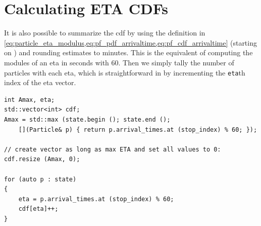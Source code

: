 \section{Calculating ETA CDFs}
\label{app:particle-eta-cdf}

It is also possible to summarize the \gls{cdf} by using the definition in \cref{eq:particle_eta_modulus,eq:pf_pdf_arrivaltime,eq:pf_cdf_arrivaltime} (starting on ) and rounding estimates to minutes. This is the equivalent of computing the modules of an \gls{eta} in seconds with 60. Then we simply tally the number of particles with each \gls{eta}, which is straightforward in \Cpp{} by incrementing the \verb+eta+th index of the \gls{eta} vector.


\begin{lstlisting}
int Amax, eta;
std::vector<int> cdf;
Amax = std::max (state.begin (); state.end ();
    [](Particle& p) { return p.arrival_times.at (stop_index) % 60; });

// create vector as long as max ETA and set all values to 0:
cdf.resize (Amax, 0);

for (auto p : state)
{
    eta = p.arrival_times.at (stop_index) % 60;
    cdf[eta]++;
}
\end{lstlisting}
